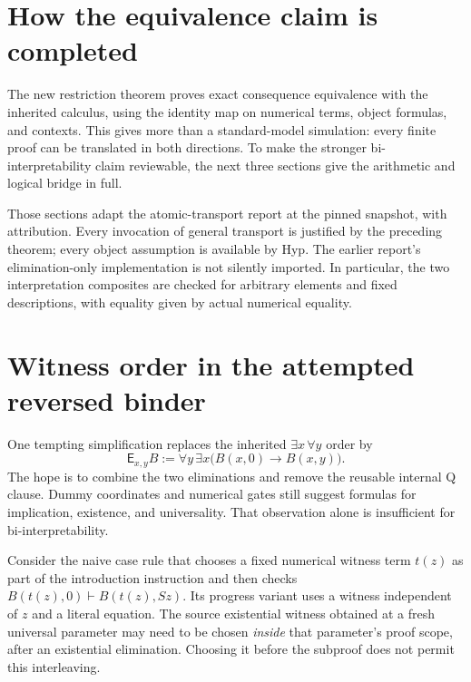 \documentclass[11pt,letterpaper]{article}
\theoremstyle{definition}\newtheorem{definition}[theorem]{Definition}
\theoremstyle{remark}\newtheorem{remark}[theorem]{Remark}
\begin{document}



\section{How the equivalence claim is completed}
\label{sec:bridge-guide}

The new restriction theorem proves exact consequence equivalence with
the inherited calculus, using the identity map on numerical terms,
object formulas, and contexts. This gives more than a standard-model
simulation: every finite proof can be translated in both directions.
To make the stronger bi-interpretability claim reviewable, the next
three sections give the arithmetic and logical bridge in full.

Those sections adapt the atomic-transport report at the pinned snapshot,
with attribution\cite{atomic}. Every invocation of general transport
is justified by the preceding theorem; every object assumption is
available by Hyp. The earlier report's elimination-only implementation
is not silently imported. In particular, the two interpretation
composites are checked for arbitrary elements and fixed descriptions,
with equality given by actual numerical equality.





\section{Witness order in the attempted reversed binder}
\label{sec:reversed}

One tempting simplification replaces the inherited
$\exists x\,\forall y$ order by
\[
 \mathsf E_{x,y}B
       :=\forall y\,\exists x\bigl(B(x,0)\to B(x,y)\bigr).
\]
The hope is to combine the two eliminations and remove the reusable
internal Q clause. Dummy coordinates and numerical gates still suggest
formulas for implication, existence, and universality. That observation
alone is insufficient for bi-interpretability.

Consider the naive case rule that chooses a fixed numerical witness
term $t(z)$ as part of the introduction instruction and then checks
$B(t(z),0)\vdash B(t(z),Sz)$. Its progress variant uses a witness
independent of $z$ and a literal equation. The source existential
witness obtained at a fresh universal parameter may need to be chosen
\emph{inside} that parameter's proof scope, after an existential
elimination. Choosing it before the subproof does not permit this
interleaving.
\end{document}
